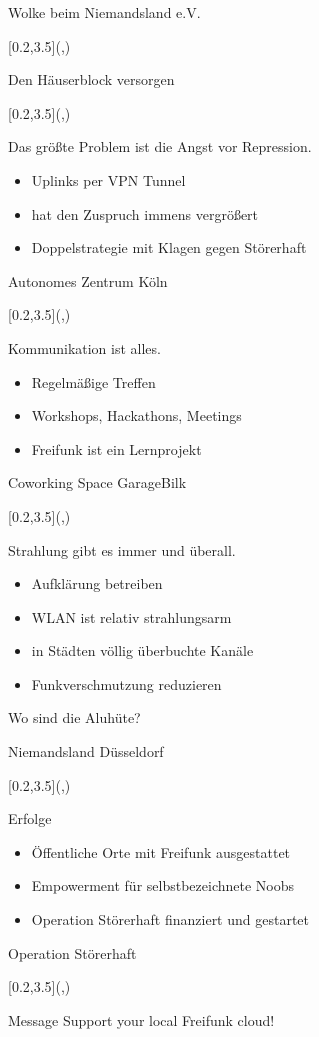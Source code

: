 \documentclass[aspectratio=1610]{beamer}
\newcommand{\boxx}[1]{
  {#1}
}
\newcommand{\photoby}[1]{
  \begin{textblock*}{\paperwidth}[0.2,3.5](\textwidth,\textheight)
    \raggedright{
      \tiny{
        \colorbox{black}{
        \color{white}{#1}
      }
      }
    }
  \end{textblock*}
}
\newcommand{\photo}[3]{
  {
    \usebackgroundtemplate{
      \texttt{[image: \#2]}
    }
    \begin{frame}{\boxx{#1}}
      \photoby{#3}
    \end{frame}
  }
}
\begin{document}
\photo{Wolke beim Niemandsland e.V.}{img/niemandsland-map.png}{freifunk-rheinland.net}
\photo{Den Häuserblock versorgen}{img/node20.png}{freifunk-rheinland.net}

\begin{frame}{Das größte Problem ist die Angst vor Repression.}
  \begin{itemize}
    \pause
    \item Uplinks per VPN Tunnel
    \pause
    \item hat den Zuspruch immens vergrößert
    \pause
    \item Doppelstrategie mit Klagen gegen Störerhaft
  \end{itemize}
\end{frame}

\photo{Autonomes Zentrum Köln}{img/azkoeln.jpg}{strassenstriche.net}

\begin{frame}{Kommunikation ist alles.}
  \begin{itemize}
    \pause
    \item Regelmäßige Treffen
    \pause
    \item Workshops, Hackathons, Meetings
    \pause
    \item Freifunk ist ein Lernprojekt
  \end{itemize}
\end{frame}

\photo{Coworking Space GarageBilk}{img/garagebilk.jpg}{Violeta Pelivan}

\begin{frame}{Strahlung gibt es immer und überall.}
  \begin{itemize}
    \pause
    \item Aufklärung betreiben
    \pause
    \item WLAN ist relativ strahlungsarm
    \pause
    \item in Städten völlig überbuchte Kanäle
    \pause
    \item Funkverschmutzung reduzieren
  \end{itemize}
  \pause
  Wo sind die Aluhüte?
\end{frame}

\photo{Niemandsland Düsseldorf}{img/niemandsland.jpg}{Niemandsland e.V.}

\begin{frame}{Erfolge}
  \begin{itemize}
    \pause
    \item Öffentliche Orte mit Freifunk ausgestattet
    \pause
    \item Empowerment für selbstbezeichnete Noobs
    \pause
    \item Operation Störerhaft finanziert und gestartet
  \end{itemize}
\end{frame}

\photo{Operation Störerhaft}{img/operation.png}{freifunk-rheinland.net}

\begin{frame}{Message}
  \Huge\center
  Support your local Freifunk cloud!
\end{frame}
\end{document}
